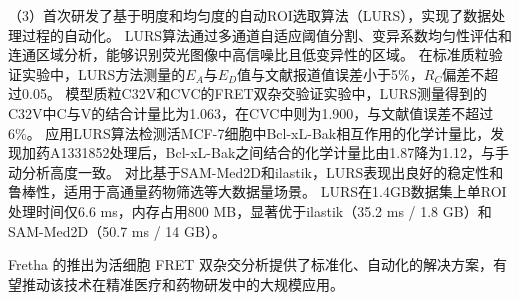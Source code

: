 \begin{cabstract}
（3）首次研发了基于明度和均匀度的自动ROI选取算法（LURS），实现了数据处理过程的自动化。
LURS算法通过多通道自适应阈值分割、变异系数均匀性评估和连通区域分析，能够识别荧光图像中高信噪比且低变异性的区域。
在标准质粒验证实验中，LURS方法测量的$E_{A}$与$E_{D}$值与文献报道值误差小于5\%，$R_{C}$偏差不超过0.05。
模型质粒C32V和CVC的FRET双杂交验证实验中，LURS测量得到的C32V中C与V的结合计量比为1.063，在CVC中则为1.900，与文献值误差不超过6\%。
应用LURS算法检测活MCF-7细胞中Bcl-xL-Bak相互作用的化学计量比，发现加药A1331852处理后，Bcl-xL-Bak之间结合的化学计量比由1.87降为1.12，与手动分析高度一致。
对比基于SAM-Med2D和ilastik，LURS表现出良好的稳定性和鲁棒性，适用于高通量药物筛选等大数据量场景。
LURS在1.4GB数据集上单ROI处理时间仅6.6 ms，内存占用800 MB，显著优于ilastik（35.2 ms / 1.8 GB）和SAM-Med2D（50.7 ms / 14 GB）。

Fretha 的推出为活细胞 FRET 双杂交分析提供了标准化、自动化的解决方案，有望推动该技术在精准医疗和药物研发中的大规模应用。
\fi
\end{cabstract}



